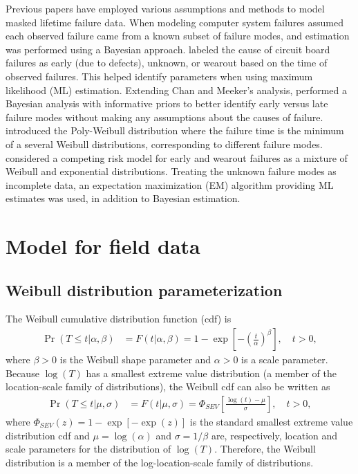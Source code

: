 \documentclass[12pt]{article}
\begin{document}
Previous papers have employed various assumptions and methods to model masked lifetime failure data.  When modeling computer system failures \citet{reiser} assumed each observed failure came from a known subset of failure modes, and estimation was performed using a Bayesian approach.  \cite{chan} labeled the cause of circuit board failures as early (due to defects), unknown, or wearout based on the time of observed failures.  This helped identify parameters when using maximum likelihood (ML) estimation.  Extending Chan and Meeker's analysis, \citet{basu} performed a Bayesian analysis with informative priors to better identify early versus late failure modes without making any assumptions about the causes of failure.  \cite{berger} introduced the Poly-Weibull distribution where the failure time is the minimum of a several Weibull distributions, corresponding to different failure modes.  \cite{ranjan} considered a competing risk model for early and wearout failures as a mixture of Weibull and exponential distributions.  Treating the unknown failure modes as incomplete data, an expectation maximization (EM) algorithm providing ML estimates was used, in addition to Bayesian estimation.


\section{Model for field data}
\label{sec:GLFP model}

\subsection{Weibull distribution parameterization}
\label{sec:Weibull parameterization}
The Weibull cumulative
 distribution function (cdf) is
\begin{align}
\label{equation:weibull.cdf}
\Pr(T \leq t|\alpha,\beta ) &= F(t|\alpha,\beta)=1-
\exp \left [-\left (\frac{t}{\alpha} \right )^{\beta}
\right ], \quad t > 0,
\end{align}
where $\beta>0$ is the Weibull shape parameter and $\alpha>0$ is a
scale parameter. Because $\log(T)$ has a smallest extreme value
distribution (a member of the location-scale family of
distributions), the Weibull cdf can also be written as
\begin{align*}
\Pr(T \leq t| \mu,\sigma ) &= F(t| \mu,\sigma)= \Phi_{SEV}\left[\frac{\log(t)-\mu}{\sigma}\right], \quad t > 0,
\end{align*}
where $\Phi_{SEV}(z)=1-\exp[-\exp(z)]$ is the standard smallest extreme value
distribution cdf and
$\mu=\log(\alpha)$ and $\sigma=1/\beta$ are, respectively, location
and scale parameters for the distribution of $\log(T)$. Therefore, the Weibull
distribution is a member of the log-location-scale family of
distributions.
\end{document}
